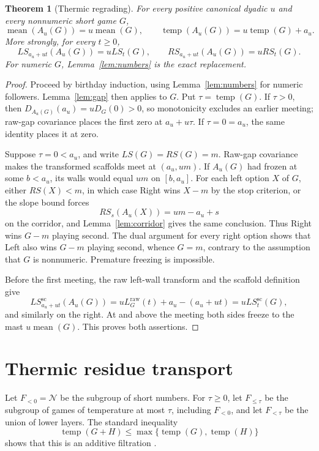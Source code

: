 \documentclass[11pt]{article}
\newtheorem{theorem}{Theorem}[section]
\theoremstyle{definition}
\theoremstyle{remark}
\newcommand{\temp}{\operatorname{temp}}
\newcommand{\mean}{\operatorname{mean}}
\newcommand{\Numbers}{\mathcal N}
\begin{document}
\begin{theorem}[Thermic regrading]\label{thm:thermic}
For every positive canonical dyadic $u$ and every nonnumeric short game $G$,
\begin{equation}
 \mean(A_u(G))=u\mean(G),\qquad
 \temp(A_u(G))=u\temp(G)+a_u.
\end{equation}
More strongly, for every $t\ge0$,
\begin{equation}
 LS_{a_u+ut}(A_u(G))=uLS_t(G),\qquad
 RS_{a_u+ut}(A_u(G))=uRS_t(G).
\end{equation}
For numeric $G$, Lemma~\ref{lem:numbers} is the exact replacement.
\end{theorem}

\begin{proof}
Proceed by birthday induction, using Lemma~\ref{lem:numbers} for numeric
followers.  Lemma~\ref{lem:gap} then applies to $G$.  Put
$\tau=\temp(G)$.  If $\tau>0$, then
$D_{A_u(G)}(a_u)=uD_G(0)>0$, so monotonicity excludes an earlier meeting;
raw-gap covariance places the first zero at
$a_u+u\tau$.  If $\tau=0=a_u$, the same identity places it at zero.

Suppose $\tau=0<a_u$, and write
$LS(G)=RS(G)=m$.  Raw-gap covariance makes the transformed
scaffolds meet at $(a_u,um)$.  If $A_u(G)$ had frozen at some $b<a_u$, its
walls would equal $um$ on $[b,a_u]$.  For each left option $X$ of $G$, either
$RS(X)<m$, in which case Right wins $X-m$ by the stop criterion, or the slope
bound forces
\[
 RS_s(A_u(X))=um-a_u+s
\]
on the corridor, and Lemma~\ref{lem:corridor} gives the same conclusion.
Thus Right wins $G-m$ playing second.  The dual argument for every right
option shows that Left also wins $G-m$ playing second, whence $G=m$, contrary
to the assumption that $G$ is nonnumeric.  Premature freezing is impossible.

Before the first meeting, the raw left-wall transform and the scaffold
definition give
\[
 LS_{a_u+ut}^{\mathrm{sc}}(A_u(G))
 =uL_G^{\mathrm{raw}}(t)+a_u-(a_u+ut)
 =uLS_t^{\mathrm{sc}}(G),
\]
and similarly on the right.  At and above the meeting both sides freeze to
the mast $u\mean(G)$.  This proves both assertions.
\end{proof}

\section{Thermic residue transport}

Let $F_{<0}=\Numbers$ be the subgroup of short numbers.  For $\tau\ge0$, let
$F_{\le\tau}$ be the subgroup of games of temperature at most $\tau$, including
$F_{<0}$, and let $F_{<\tau}$ be the union of lower layers.  The standard
inequality
\begin{equation}
  \temp(G+H)\le\max\{\temp(G),\temp(H)\}
\end{equation}
shows that this is an additive filtration
\cite[Theorem II.5.18]{siegel2013}.
\end{document}
